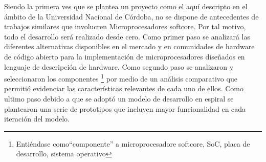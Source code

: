 Siendo la primera ves que se plantea un proyecto como el aquí
descripto en el ámbito de la Universidad Nacional de Córdoba, no se
dispone de antecedentes de trabajos similares que involucren
Microprocesadores softcore. Por tal motivo, todo el desarrollo será
realizado desde cero. Como primer paso se analizará las diferentes
alternativas disponibles en el mercado y en comunidades de hardware de
código abierto para la implementación de microprocesadores diseñados
en lenguaje de descripción de hardware. Como segundo paso 
se analizaron y seleccionaron los componentes \footnote{Entiéndase como``componente'' a 
microprocesadore softcore, SoC, placa de desarrollo, sistema operativo} 
por medio de un análisis comparativo que permitió evidenciar las características relevantes de
cada uno de ellos. Como ultimo paso debido a que se adoptó un modelo de desarrollo en espiral 
se plantearon una serie de prototipos que incluyen mayor funcionalidad en cada iteración del modelo.


